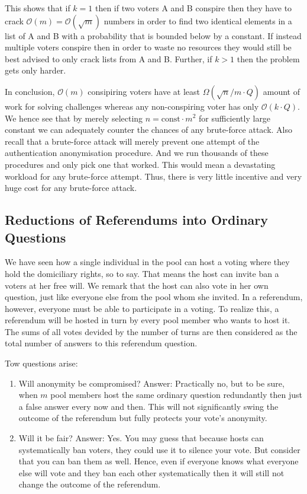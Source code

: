 \documentclass{article}
\newcommand{\cO}{\mathcal{O}\xspace}
\theoremstyle{definition}
\begin{document}
	This shows that if $k=1$ then if two voters A and B conspire then they have to crack $\cO(m)=\cO(\sqrt{m})$ numbers in order to find two identical elements in a list of A and B with a probability that is bounded below by a constant. If instead multiple voters conspire then in order to waste no resources they would still be best advised to only crack lists from A and B. Further, if $k>1$ then the problem gets only harder.
	
	In conclusion, $\cO(m)$ consipiring voters have at least $\Omega(\sqrt{n}/m \cdot Q)$ amount of work for solving challenges whereas any non-conspiring voter has only $\cO(k \cdot Q)$. We hence see that by merely selecting $n = \text{const} \cdot m^2$ for sufficiently large constant we can adequately counter the chances of any brute-force attack. Also recall that a brute-force attack will merely prevent one attempt of the authentication anonymisation procedure. And we run thousands of these procedures and only pick one that worked. This would mean a devastating workload for any brute-force attempt. Thus, there is very little incentive and very huge cost for any brute-force attack.
	
	\subsection{Reductions of Referendums into Ordinary Questions}
	We have seen how a single individual in the pool can host a voting where they hold the domiciliary rights, so to say. That means the host can invite ban a voters at her free will. We remark that the host can also vote in her own question, just like everyone else from the pool whom she invited. In a referendum, however, everyone must be able to participate in a voting. To realize this, a referendum will be hosted in turn by every pool member who wants to host it. The sums of all votes devided by the number of turns are then considered as the total number of answers to this referendum question.
	
	Tow questions arise:
	\begin{enumerate}
		\item Will anonymity be compromised? Answer: Practically no, but to be sure, when $m$ pool members host the same ordinary question redundantly then just a false answer every now and then. This will not significantly swing the outcome of the referendum but fully protects your vote's anonymity.
		\item Will it be fair? Answer: Yes. You may guess that because hosts can systematically ban voters, they could use it to silence your vote. But consider that you can ban them as well. Hence, even if everyone knows what everyone else will vote and they ban each other systematically then it will still not change the outcome of the referendum.
	\end{enumerate}
	
\end{document}
